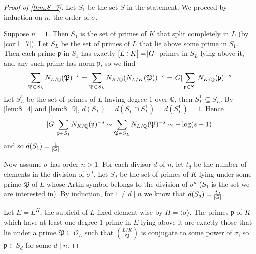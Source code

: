 \documentclass[11pt]{article}
\theoremstyle{definition}
\theoremstyle{plain}
\theoremstyle{remark}
\newcommand{\QQ}{\mathbb{Q}}
\newcommand{\cO}{\mathcal{O}}
\newcommand{\cp}{\mathfrak{P}}
\newcommand{\fp}{\mathfrak{p}}
\newcommand{\leg}[2]{\left(\frac{#1}{#2}\right)}
\begin{document}
\begin{proof}[Proof of \autoref{thm:8_7}]
    Let $S_1$ be the set $S$ in the statement.
    We proceed by induction on $n$, the order of $\sigma$.

    Suppose $n = 1$. Then $S_1$ is the set of primes of $K$ that split completely in $L$ (by \autoref{cor:1_7}). Let $S_L$ be the set of primes of $L$ that lie above some prime in $S_1$. Then each prime $\fp$ in $S_1$ has exactly $[L:K] = \abs{G}$ primes in $S_L$ lying above it, and any such prime has norm $\fp$, so we find
    \begin{equation*}
        \sum_{\cp \in S_L} N_{L/\QQ}(\cp)^{-s}
        = \sum_{\cp \in S_L} N_{K/\QQ}(N_{L/K}(\cp))^{-s}
        = \abs{G} \sum_{\fp \in S_1} N_{K/\QQ}(\fp)^{-s}
    \end{equation*}
    Let $S_L^1$ be the set of primes of $L$ having degree $1$ over $\QQ$, then $S_L^1 \subseteq S_L$. By \autoref{lem:8_4} and \autoref{lem:8_9}, $d(S_L) = d(S_L \cap S_L^1) = d(S_L^1) = 1$. Hence
    \begin{equation*}
        \abs{G} \sum_{\fp \in S_1} N_{K/\QQ}(\fp)^{-s} \sim \sum_{\cp \in S_L} N_{L/\QQ}(\cp)^{-s} \sim -\log(s-1)
    \end{equation*}
    and so $d(S_1) = \frac{1}{\abs{G}}$.

    Now assume $\sigma$ has order $n > 1$. For each divisor $d$ of $n$, let $t_d$ be the number of elements in the division of $\sigma^d$. Let $S_d$ be the set of primes of $K$ lying under some prime $\cp$ of $L$ whose Artin symbol belongs to the division of $\sigma^d$ ($S_1$ is the set we are interested in). By induction, for $1 \neq d \mid n$ we know that $d(S_d) = \frac{t_d}{\abs{G}}$.

    Let $E = L^H$, the subfield of $L$ fixed element-wise by $H = \langle \sigma \rangle$. The primes $\fp$ of $K$ which have at least one degree $1$ prime in $E$ lying above it are exactly those that lie under a prime $\cp \subseteq \cO_L$ such that $\leg{L/K}{\cp}$ is conjugate to some power of $\sigma$, so $\fp \in S_d$ for some $d \mid n$. %


\end{proof}
\end{document}
